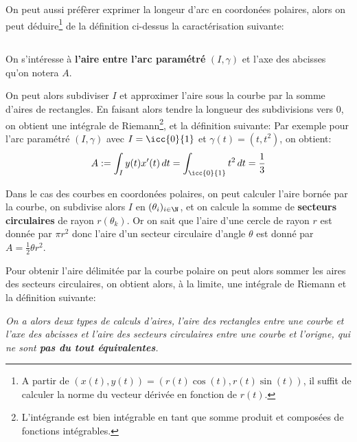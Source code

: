 On peut aussi préfèrer exprimer la longeur d'arc en coordonées polaires, alors on peut déduire\footnote[1]{A partir de \((x(t), y(t)) = (r(t)\cos(t), r(t)\sin(t))\), il suffit de calculer la norme du vecteur dérivée en fonction de \(r(t)\).} de la définition ci-dessus la caractérisation suivante:

\subsection*{}
On s'intéresse à \textbf{l'aire entre l'arc paramétré} \((I, \gamma)\) et l'axe des abcisses qu'on notera \(A\).

On peut alors subdiviser \(I\) et approximer l'aire sous la courbe par la somme d'aires de rectangles. En faisant alors tendre la longueur des subdivisions vers 0, on obtient une intégrale de Riemann\footnote[2]{L'intégrande est bien intégrable en tant que somme produit et composées de fonctions intégrables.}, et la définition suivante:
Par exemple pour l'arc paramétré \((I, \gamma)\) avec \(I = \icc{0}{1}\) et \(\gamma(t) = (t, t^2)\), on obtient:
\[
   A := \int_I y(t)x'(t)\, dt = \int_{\icc{0}{1}} t^2\, dt = \frac{1}{3}
\]

Dans le cas des courbes en coordonées polaires, on peut calculer l'aire bornée par la courbe, on subdivise alors \(I\) en \((\theta_i)_{i \in \N}\), et on calcule la somme de \textbf{secteurs circulaires} de rayon \(r(\theta_k)\). Or on sait que l'aire d'une cercle de rayon \(r\) est donnée par \(\pi r^2\) donc l'aire d'un secteur circulaire d'angle \(\theta\) est donné par \(A = \frac{1}{2}\theta r^2\).\<

Pour obtenir l'aire délimitée par la courbe polaire on peut alors sommer les aires des secteurs circulaires, on obtient alors, à la limite, une intégrale de Riemann et la définition suivante:
\begin{center}
   \textit{
      On a alors deux types de calculs d'aires, l'aire des rectangles entre une courbe et l'axe des abcisses et l'aire des secteurs circulaires entre une courbe et l'origne, qui ne sont \textbf{pas du tout équivalentes}.
   }
\end{center}

